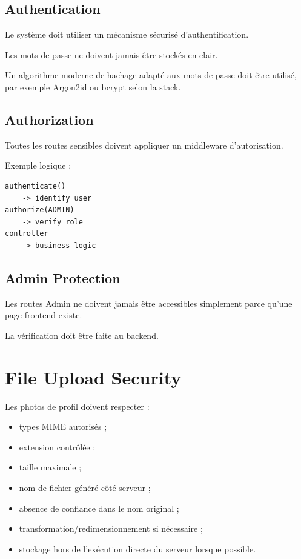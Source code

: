 \documentclass[11pt,a4paper]{report}
\begin{document}
\section{Authentication}

Le système doit utiliser un mécanisme sécurisé d'authentification.

Les mots de passe ne doivent jamais être stockés en clair.

Un algorithme moderne de hachage adapté aux mots de passe doit être utilisé, par exemple Argon2id ou bcrypt selon la stack.

\section{Authorization}

Toutes les routes sensibles doivent appliquer un middleware d'autorisation.

Exemple logique :

\begin{lstlisting}
authenticate()
    -> identify user
authorize(ADMIN)
    -> verify role
controller
    -> business logic
\end{lstlisting}

\section{Admin Protection}

Les routes Admin ne doivent jamais être accessibles simplement parce qu'une page frontend existe.

La vérification doit être faite au backend.

\chapter{File Upload Security}

Les photos de profil doivent respecter :

\begin{itemize}
    \item types MIME autorisés ;
    \item extension contrôlée ;
    \item taille maximale ;
    \item nom de fichier généré côté serveur ;
    \item absence de confiance dans le nom original ;
    \item transformation/redimensionnement si nécessaire ;
    \item stockage hors de l'exécution directe du serveur lorsque possible.
\end{itemize}
\end{document}
